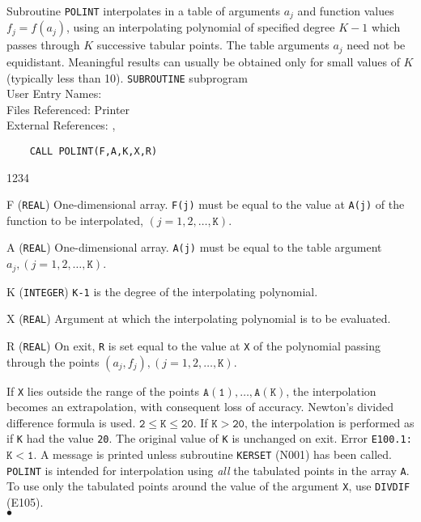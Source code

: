                          
                        
\Submitter{}                               
                         
Subroutine {\tt POLINT} interpolates in a table of arguments $a_j$ and
function values
$ f_j = f(a_j)$, using an interpolating polynomial of
specified degree $K-1$ which passes through $K$ successive tabular
points. The table arguments $a_j$ need not be equidistant.
Meaningful results can usually be obtained only for
small values of $K$ (typically less than 10).
\Structure
{\tt SUBROUTINE} subprogram    \\
User Entry Names: \\
Files Referenced:  Printer \\
External References: ,  
\Usage
\begin{verbatim}
    CALL POLINT(F,A,K,X,R)
\end{verbatim}
\begin{DLtt}{1234}
\item [F]({\tt REAL}) One-dimensional array. {\tt F(j)} must be equal
to the value at {\tt A(j)} of the function to be interpolated,
$(j=1,2,\ldots,\mathtt{K})$.
\item [A]({\tt REAL}) One-dimensional array. {\tt A(j)} must be equal
to the table argument $a_j,(j=1,2,\ldots,\mathtt{K})$.
\item [K]({\tt INTEGER}) {\tt K-1} is the degree of the
interpolating polynomial.
\item [X]({\tt REAL}) Argument at which the interpolating polynomial
is to be evaluated.
\item [R]({\tt REAL}) On exit, {\tt R} is set equal to the value at
{\tt X} of the polynomial passing through the points
$(a_j,f_j),(j=1,2,\ldots,\mathtt{K})$.
\end{DLtt}
If {\tt X} lies outside the range of the points
$\mathtt{A(1),\ldots,A(K)}$, the interpolation becomes an extrapolation,
with consequent loss of accuracy.
\Method
Newton's divided difference formula is used.
\Restrict
$\mathtt{2 \leq K \leq 20}$. If $\mathtt{K>20}$, the interpolation
is performed as if {\tt K} had the value {\tt 20}. The original value of
{\tt K} is unchanged on exit.
\Errorh
Error {\tt E100.1:}  $\mathtt{K < 1}$. A message is printed unless
subroutine {\tt KERSET} (N001) has been called.
\Notes
{\tt POLINT} is intended for interpolation using {\it all} the
tabulated points in the array {\tt A}. To use only the tabulated points
around the value of the argument {\tt X}, use {\tt DIVDIF} (E105).
\\ $\bullet$
